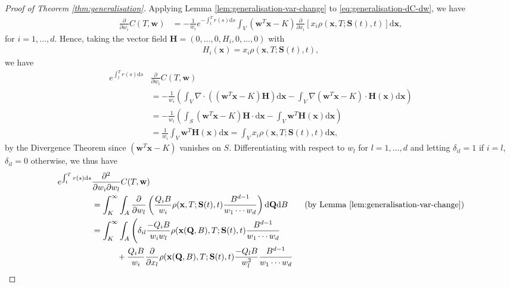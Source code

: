 \documentclass[english]{article}
\numberwithin{equation}{section}
\numberwithin{figure}{section}
\theoremstyle{bolddescit}
\theoremstyle{definition}
\theoremstyle{definition}
\theoremstyle{plain}
\theoremstyle{plain}
\theoremstyle{bolddesc}
\theoremstyle{plain}
\theoremstyle{remark}
\begin{document}
\begin{proof}[Proof of Theorem \ref{thm:generalisation}]
  Applying Lemma \ref{lem:generalisation-var-change} to \eqref{eq:generalisation-dC-dw}, we have
  \begin{align*}
    \frac{\partial}{\partial w_i} C(T,\mathbf{w})
    &= - \frac{1}{w_i}e^{-\int_t^T r(s) \mathrm{d}s}
    \int_V \left(\mathbf{w}^T \mathbf{x} - K\right) \frac{\partial}{\partial x_i}\left[x_i \rho(\mathbf{x},T;\mathbf{S}(t),t) \right] \mathrm{d}\mathbf{x},
  \end{align*}
  for $i=1,\ldots,d$. Hence, taking the vector field $\mathbf{H} = (0,\ldots,0,H_i,0,\ldots,0)$ with
  \begin{align*}
    H_i(\mathbf{x}) = x_i \rho(\mathbf{x},T;\mathbf{S}(t),t),
  \end{align*}
  we have
  \begin{align*}
    e^{\int_t^T r(s) \mathrm{d}s} &\frac{\partial}{\partial w_i} C(T,\mathbf{w})\\
    &= - \frac{1}{w_i} \left( \int_V \nabla \cdot ((\mathbf{w}^T \mathbf{x} - K) \mathbf{H}) \mathrm{d}\mathbf{x} - \int_V \nabla (\mathbf{w}^T \mathbf{x} - K) \cdot \mathbf{H}(\mathbf{x}) \mathrm{d}\mathbf{x} \right)\\
    &= - \frac{1}{w_i} \left( \int_S (\mathbf{w}^T \mathbf{x} - K) \mathbf{H} \cdot \mathrm{d}\mathbf{x} - \int_V \mathbf{w}^T \mathbf{H}(\mathbf{x}) \mathrm{d}\mathbf{x} \right)\\
    &= \frac{1}{w_i} \int_V \mathbf{w}^T \mathbf{H}(\mathbf{x}) \mathrm{d}\mathbf{x}
    = \int_V x_i \rho(\mathbf{x},T;\mathbf{S}(t),t) \mathrm{d}\mathbf{x},
  \end{align*}
  by the Divergence Theorem since $(\mathbf{w}^T \mathbf{x} - K)$ vanishes on $S$. Differentiating with respect to $w_l$ for $l=1,\ldots,d$ and letting $\delta_{il} = 1$ if $i=l$, $\delta_{il} = 0$ otherwise, we thus have
  \begin{align*}
    e^{\int_t^T r(s) \mathrm{d}s} &\frac{\partial^2}{\partial w_i \partial w_l} C(T,\mathbf{w})\\
    &= \int_K^\infty \int_A \frac{\partial}{\partial w_l} \left(\frac{Q_i B}{w_i} \rho(\mathbf{x},T;\mathbf{S}(t),t) \frac{B^{d-1}}{w_1 \cdots w_d} \right) \mathrm{d}\mathbf{Q} \mathrm{d}B \tag{by Lemma \ref{lem:generalisation-var-change}}\\
    &= \int_K^\infty \int_A \Bigg(
      \delta_{il} \frac{- Q_i B}{w_i w_l} \rho(\mathbf{x}(\mathbf{Q},B),T;\mathbf{S}(t),t) \frac{B^{d-1}}{w_1 \cdots w_d}\\
      &\ \ \ \ \ \ \ \ \ + \frac{Q_i B}{w_i} \frac{\partial}{\partial x_l} \rho(\mathbf{x}(\mathbf{Q},B),T;\mathbf{S}(t),t) \frac{- Q_l B}{w_l^2} \frac{B^{d-1}}{w_1 \cdots w_d}\\

\end{align*}
\end{proof}
\end{document}
